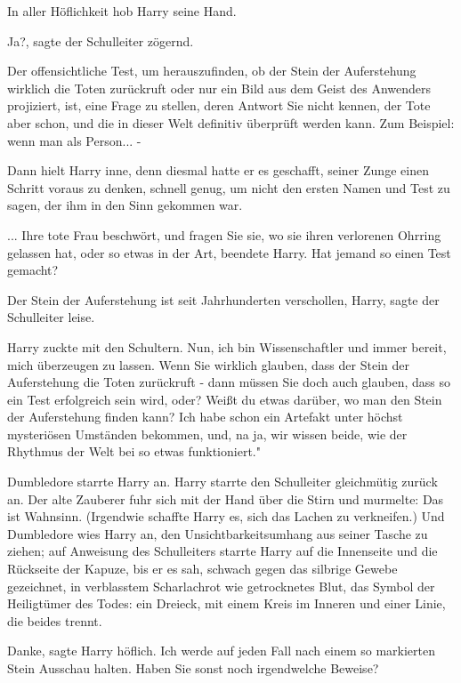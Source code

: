 In aller Höflichkeit hob Harry seine Hand.

\glqq{}Ja?\grqq{}, sagte der Schulleiter zögernd.

\glqq{}Der offensichtliche Test, um herauszufinden, ob der Stein der Auferstehung
wirklich die Toten zurückruft oder nur ein Bild aus dem Geist des Anwenders
projiziert, ist, eine Frage zu stellen, deren Antwort Sie nicht kennen, der Tote
aber schon, und die in dieser Welt definitiv überprüft werden kann. Zum
Beispiel: wenn man als Person... -\grqq{}

Dann hielt Harry inne, denn diesmal hatte er es geschafft, seiner Zunge einen
Schritt voraus zu denken, schnell genug, um nicht den ersten Namen und Test zu
sagen, der ihm in den Sinn gekommen war.

\glqq{}... Ihre tote Frau beschwört, und fragen Sie sie, wo sie ihren verlorenen
Ohrring gelassen hat, oder so etwas in der Art\grqq{}, beendete Harry. \glqq{}Hat
jemand so einen Test gemacht?\grqq{}

\glqq{}Der Stein der Auferstehung ist seit Jahrhunderten verschollen,
Harry\grqq{}, sagte der Schulleiter leise.

Harry zuckte mit den Schultern. \glqq{}Nun, ich bin Wissenschaftler und immer
bereit, mich überzeugen zu lassen. Wenn Sie wirklich glauben, dass der Stein der
Auferstehung die Toten zurückruft - dann müssen Sie doch auch glauben, dass so
ein Test erfolgreich sein wird, oder? Weißt du etwas darüber, wo man den Stein
der Auferstehung finden kann? Ich habe schon ein Artefakt unter höchst
mysteriösen Umständen bekommen, und, na ja, wir wissen beide, wie der Rhythmus
der Welt bei so etwas funktioniert."

Dumbledore starrte Harry an. Harry starrte den Schulleiter gleichmütig zurück
an. Der alte Zauberer fuhr sich mit der Hand über die Stirn und murmelte: \glqq
Das ist Wahnsinn.\grqq{} (Irgendwie schaffte Harry es, sich das Lachen zu
verkneifen.) Und Dumbledore wies Harry an, den Unsichtbarkeitsumhang aus seiner
Tasche zu ziehen; auf Anweisung des Schulleiters starrte Harry auf die
Innenseite und die Rückseite der Kapuze, bis er es sah, schwach gegen das
silbrige Gewebe gezeichnet, in verblasstem Scharlachrot wie getrocknetes Blut,
das Symbol der Heiligtümer des Todes: ein Dreieck, mit einem Kreis im Inneren
und einer Linie, die beides trennt.

\glqq{}Danke\grqq{}, sagte Harry höflich. \glqq{}Ich werde auf jeden Fall nach
einem so markierten Stein Ausschau halten. Haben Sie sonst noch irgendwelche
Beweise?\grqq{}


